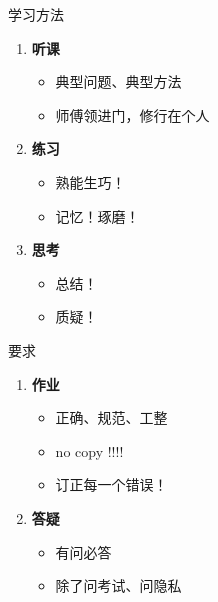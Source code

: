 \begin{frame}[<+->]{学习方法}
	\linespread{1.4}
	\begin{enumerate}
	  \item {\bf 听课}
	  \begin{itemize}
	    \item 典型问题、典型方法
	    \item 师傅领进门，修行在个人
	  \end{itemize}
	  \item {\bf 练习}
	  \begin{itemize}
	    \item 熟能生巧！
	    \item 记忆！琢磨！
	  \end{itemize}
	  \item {\bf 思考}
	  \begin{itemize}
	    \item 总结！
	    \item 质疑！
	  \end{itemize}
	\end{enumerate}
\end{frame}

\begin{frame}[<+->]{要求}
	\linespread{1.4}
	\begin{enumerate}
	  \item {\bf 作业}
	  \begin{itemize}
	    \item 正确、规范、工整
	    \item no copy !!!!
	    \item 订正每一个错误！
	  \end{itemize}
	  \item {\bf 答疑}
	  \begin{itemize}
	    \item 有问必答
	    \item 除了问考试、问隐私
	  \end{itemize}
	\end{enumerate}
\end{frame}

